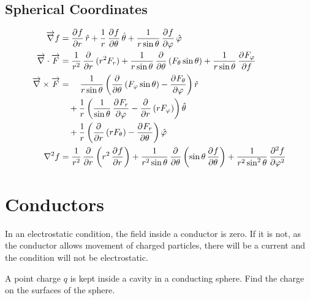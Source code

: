 \documentclass[fleqn, a4paper, 12pt, twoside]{article}
\theoremstyle{definition}
\theoremstyle{theorem}
\begin{document}
\subsection{Spherical Coordinates}

\begin{align*}
	\overrightarrow{\nabla} f &= \dpd{f}{r} \hat{r} + \dfrac{1}{r} \dpd{f}{\theta} \hat{\theta} + \dfrac{1}{r \sin \theta} \dpd{f}{\varphi} \hat{\varphi}\\
	\overrightarrow{\nabla} \cdot \overrightarrow{F} &= \dfrac{1}{r^2} \dpd{}{r} (r^2 F_r) + \dfrac{1}{r \sin \theta} \dpd{}{\theta} (F_{\theta} \sin \theta) + \dfrac{1}{r \sin \theta} \dpd{F_{\varphi}}{f}\\
	\overrightarrow{\nabla} \times \overrightarrow{F} &= \quad \dfrac{1}{r \sin \theta} \left( \dpd{}{\theta} (F_{\varphi} \sin \theta) - \dpd{F_{\theta}}{\varphi} \right) \hat{r}\\
	&\quad + \dfrac{1}{r} \left( \dfrac{1}{\sin \theta} \dpd{F_r}{\varphi} - \dpd{}{r} (r F_{\varphi}) \right) \hat{\theta}\\
	&\quad + \dfrac{1}{r} \left( \dpd{}{r} (r F_{\theta}) - \dpd{F_r}{\theta} \right) \hat{\varphi}\\
	\nabla^2 f &= \dfrac{1}{r^2} \dpd{}{r} \left( r^2 \dpd{f}{r} \right) + \dfrac{1}{r^2 \sin \theta} \dpd{}{\theta} \left( \sin \theta \dpd{f}{\theta} \right) + \dfrac{1}{r^2 \sin^2 \theta} \dpd[2]{f}{\varphi}
\end{align*}

\section{Conductors}

In an electrostatic condition, the field inside a conductor is zero.
If it is not, as the conductor allows movement of charged particles, there will be a current and the condition will not be electrostatic.

\begin{question}
	A point charge $q$ is kept inside a cavity in a conducting sphere.
	Find the charge on the surfaces of the sphere.
	\begin{figure}[H]
	\end{figure}
\end{question}
\end{document}

